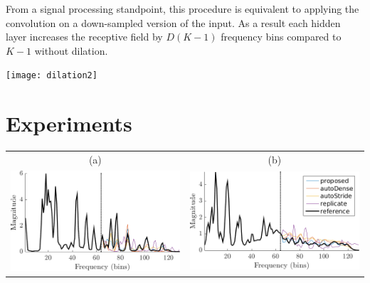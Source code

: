 \documentclass[a0,portrait,20pt]{a0poster}
\begin{document}
\begin{multicols}{2}
\begin{minipage}[c]{.4\linewidth}
From a signal processing standpoint, this procedure is equivalent to applying the convolution on a down-sampled version of the input. As a result each hidden layer increases the receptive field by $D(K-1)$ frequency bins compared to $K-1$ without dilation.
\end{minipage}
\begin{minipage}[c]{.55\linewidth}
\begin{center}\vspace{1cm}
\texttt{[image: dilation2]}
\end{center}\vspace{1cm}
\end{minipage}

\section*{Experiments}

\begin{center}\vspace{1cm}
\begin{tabular}{cc}
  (a) & (b) \\
  \includegraphics[width = .45\columnwidth]{solos_1141.png}
&
  \includegraphics[width = .45\columnwidth]{gtzan_1120.png}
\end{tabular}
\end{center}\vspace{1cm}


\end{multicols}
\end{document}

